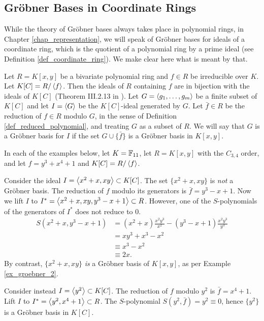\subsection{Gr\"obner Bases in Coordinate Rings}

While the theory of Gr\"obner bases always takes place in polynomial rings,
in Chapter \ref{chap_representation}, we will speak of Gr\"obner bases for ideals of a coordinate ring,
which is the quotient of a polynomial ring by a prime ideal (see Definition \ref{def_coordinate_ring}).
We make clear here what is meant by that.

Let $R = K[x,y]$ be a bivariate polynomial ring and $f \in R$ be irreducible over $K$.
Let $K[C] = R/\left\langle f \right\rangle$.
Then the ideals of $R$ containing $f$ are in bijection with the ideals of $K[C]$
(Theorem III.2.13 in \cite{hungerford}).
Let $G = \left\langle g_1, \ldots, g_m \right\rangle$ be a finite subset of $K[C]$
and let $I = \left\langle G \right\rangle$ be the $K[C]$-ideal generated by $G$.
Let $\bar f \in R$ be the reduction of $f \in R$ modulo $G$, in the sense of Definition \ref{def_reduced_polynomial},
and treating $G$ as a subset of $R$.
We will say that $G$ is a Gr\"obner basis for $I$ if the set $G \cup \{ \bar f \}$ is a Gr\"obner basis in $K[x,y]$.

In each of the examples below,
let $K = \mathbb{F}_{11}$,
let $R = K[x,y]$ with the $C_{3,4}$ order,
and let $f = y^3 + x^4 + 1$ and $K[C] = R/\left\langle f \right\rangle$.
\begin{example}
  Consider the ideal $I = \left\langle x^2 + x, xy \right\rangle \subset K[C]$.
  The set $\{ x^2 + x, xy \}$ is \emph{not} a Gr\"obner basis.
  The reduction of $f$ modulo its generators is $\bar f = y^3 - x + 1$.
  Now we lift $I$ to $I^* = \left\langle x^2 + x, xy, y^3 - x + 1 \right\rangle \subset R$.
  However, one of the $S$-polynomials of the generators of $I^*$ does not reduce to 0.
  \begin{align*}
    S(x^2 + x, y^3 - x + 1)
      &= (x^2 + x)\frac{x^2y^3}{x^2} - (y^3 - x + 1)\frac{x^2y^3}{y^3} \\
      &= xy^3 + x^3 - x^2 \\
      &\equiv x^3 - x^2 \\
      &\equiv 2x.
  \end{align*}
  By contrast, $\{x^2 + x, xy\}$ \emph{is} a Gr\"obner basis of $K[x,y]$,
  as per Example \ref{ex_groebner_2}.
\end{example}
\begin{example}
  Consider instead $I = \left\langle y^2 \right\rangle \subset K[C]$.
  The reduction of $f$ modulo $y^2$ is $\bar f = x^4 + 1$.
  Lift $I$ to $I^* = \left\langle y^2, x^4 + 1 \right\rangle \subset R$.
  The $S$-polynomial $S(y^2, \bar f) = y^2 \equiv 0$,
  hence $\{y^2\}$ is a Gr\"obner basis in $K[C]$.
\end{example}
